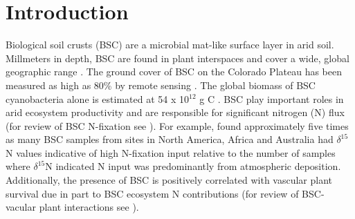\section{Introduction}


Biological soil crusts (BSC) are a microbial mat-like surface layer in arid
soil. Millmeters in depth, BSC are found in plant interspaces and cover a wide,
global geographic range \cite{garcia2003estimates}. The ground cover of BSC on
the Colorado Plateau has been measured as high as 80\% by remote sensing
\cite{karnieli2001}. The global biomass of BSC cyanobacteria alone is estimated
at 54 x 10$^{12}$ g C \cite{garcia2003estimates}. BSC play important roles in
arid ecosystem productivity and are responsible for significant nitrogen (N)
flux (for review of BSC N-fixation see \citet{belnap2003}). For example,
\citet{Evans_1999} found approximately five times as many BSC samples from
sites in North America, Africa and Australia had $\delta^{15}$N values
indicative of high N-fixation input relative to the number of samples where
$\delta^{15}$N indicated N input was predominantly from atmospheric deposition.
Additionally, the presence of BSC is positively correlated with vascular plant
survival due in part to BSC ecosystem N contributions (for review of
BSC-vacular plant interactions see \citet{BelnapVascular}).

